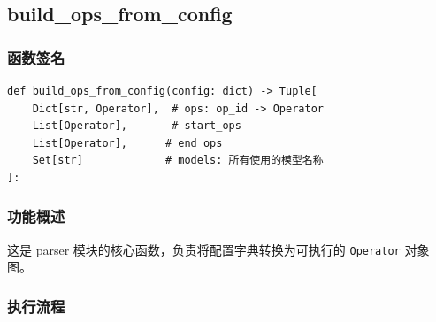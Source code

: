 \documentclass[12pt,a4paper]{article}
\begin{document}
\subsection{build\_ops\_from\_config}

\subsubsection{函数签名}

\begin{lstlisting}
def build_ops_from_config(config: dict) -> Tuple[
    Dict[str, Operator],  # ops: op_id -> Operator
    List[Operator],       # start_ops
    List[Operator],      # end_ops
    Set[str]             # models: 所有使用的模型名称
]:
\end{lstlisting}

\subsubsection{功能概述}

这是 parser 模块的核心函数，负责将配置字典转换为可执行的 \texttt{Operator} 对象图。

\subsubsection{执行流程}
\end{document}
